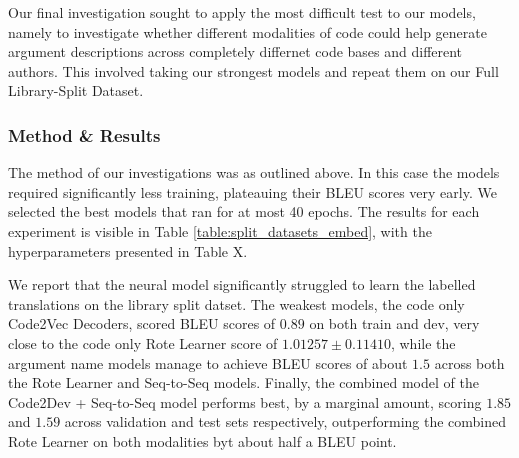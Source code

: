 Our final investigation sought to apply the most difficult test to our models, namely to investigate whether different modalities of code could help generate argument descriptions across completely differnet code bases and different authors.
This involved taking our strongest models and repeat them on our Full Library-Split Dataset.

\subsubsection{Method \& Results}  %

The method of our investigations was as outlined above. In this case the models required significantly less training, plateauing their BLEU scores very early. We selected the best models that ran for at most 40 epochs. 
The results for each experiment is visible in Table \ref{table:split_datasets_embed}, with the hyperparameters presented in Table X.

We report that the neural model significantly struggled to learn the labelled translations on the library split datset.
The weakest models, the code only Code2Vec Decoders, scored BLEU scores of $0.89$ on both train and dev, very close to the code only Rote Learner score of   $ 1.01257 \pm  0.11410$, while the argument name models manage to achieve BLEU scores of about $1.5$ across both the Rote Learner and Seq-to-Seq models. 
Finally, the combined model of the Code2Dev + Seq-to-Seq model performs best, by a marginal amount, scoring  $ 1.85 $ and $ 1.59 $ across validation and test sets respectively,  outperforming the combined Rote Learner on both modalities byt about half a BLEU point.



